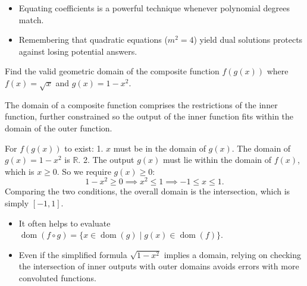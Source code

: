 \begin{takeaways}
\begin{itemize}[leftmargin=*]
\item Equating coefficients is a powerful technique whenever polynomial degrees match.
\item Remembering that quadratic equations ($m^2=4$) yield dual solutions protects against losing potential answers.
\end{itemize}
\end{takeaways}

\begin{problem}
Find the valid geometric domain of the composite function $f(g(x))$ where $f(x) = \sqrt{x}$ and $g(x) = 1 - x^2$.
\end{problem}

\begin{hint}
The domain of a composite function comprises the restrictions of the inner function, further constrained so the output of the inner function fits within the domain of the outer function.
\end{hint}

\begin{solution}
For $f(g(x))$ to exist:
1. $x$ must be in the domain of $g(x)$. The domain of $g(x) = 1-x^2$ is $\mathbb{R}$.
2. The output $g(x)$ must lie within the domain of $f(x)$, which is $x \ge 0$.
So we require $g(x) \ge 0$:
\[ 1 - x^2 \ge 0 \implies x^2 \le 1 \implies -1 \le x \le 1. \]
Comparing the two conditions, the overall domain is the intersection, which is simply $\boxed{[-1, 1]}$.
\end{solution}

\begin{takeaways}
\begin{itemize}[leftmargin=*]
\item It often helps to evaluate $\operatorname{dom}(f\circ g) = \{x \in \operatorname{dom}(g) \mid g(x) \in \operatorname{dom}(f)\}$.
\item Even if the simplified formula $\sqrt{1-x^2}$ implies a domain, relying on checking the intersection of inner outputs with outer domains avoids errors with more convoluted functions.
\end{itemize}
\end{takeaways}


